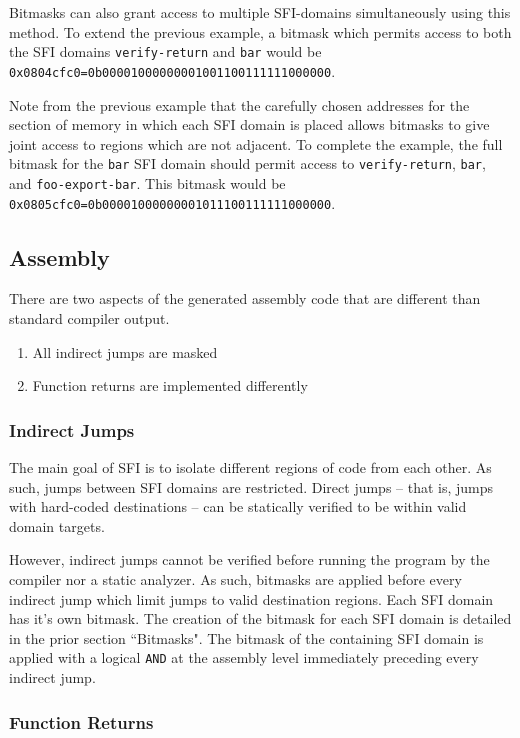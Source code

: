 \documentclass[12pt]{article}
\begin{document}
Bitmasks can also grant access to multiple SFI-domains simultaneously using this method. To extend the previous example, a bitmask which permits access to both the SFI domains \texttt{verify-return} and \texttt{bar} would be \texttt{0x0804cfc0=0b00001000000001001100111111000000}.

Note from the previous example that the carefully chosen addresses for the section of memory in which each SFI domain is placed allows bitmasks to give joint access to regions which are not adjacent. To complete the example, the full bitmask for the \texttt{bar} SFI domain should permit access to \texttt{verify-return}, \texttt{bar}, and \texttt{foo-export-bar}. This bitmask would be \texttt{0x0805cfc0=0b00001000000001011100111111000000}.

\subsection{Assembly}

There are two aspects of the generated assembly code that are different than standard compiler output.

\begin{enumerate}
	\item All indirect jumps are masked
	\item Function returns are implemented differently
\end{enumerate}

\subsubsection{Indirect Jumps}

The main goal of SFI is to isolate different regions of code from each other. As such, jumps between SFI domains are restricted. Direct jumps -- that is, jumps with hard-coded destinations -- can be statically verified to be within valid domain targets.

However, indirect jumps cannot be verified before running the program by the compiler nor a static analyzer. As such, bitmasks are applied before every indirect jump which limit jumps to valid destination regions. Each SFI domain has it's own bitmask. The creation of the bitmask for each SFI domain is detailed in the prior section ``Bitmasks".  The bitmask of the containing SFI domain is applied with a logical \texttt{AND} at the assembly level immediately preceding every indirect jump.

\subsubsection{Function Returns}
\end{document}
